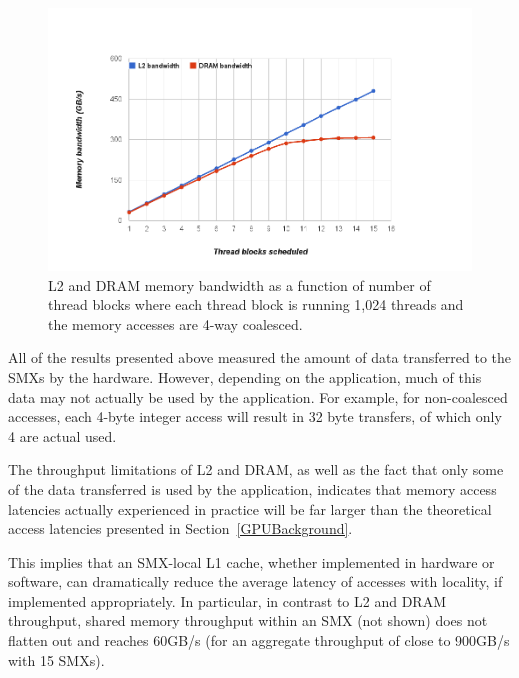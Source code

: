 \begin{figure}
\center
\includegraphics[scale=0.30]{DRAML2Bandwidth-4wayCoalesced.png}
\caption{\footnotesize\textnormal{L2 and DRAM memory bandwidth as a function of number of thread blocks where each thread
block is running 1,024 threads and the memory accesses are 4-way coalesced.
}}
\label{fig:L2-DRAM-bandwidth}
\end{figure}

All of the results presented above measured the amount of data transferred to the SMXs by the
hardware.
However, depending on the application, much of this data may not actually be used by the
application.
For example, for non-coalesced accesses, each 4-byte integer access will result in 32
byte transfers, of which only 4 are actual used.

The throughput limitations of L2 and DRAM, as well as the fact that only some of the data transferred is used by the application, indicates that memory access latencies actually experienced in practice will be far larger than the theoretical access latencies presented in Section~\ref{GPUBackground}.

This implies that an SMX-local L1 cache, whether implemented in hardware or software, can
dramatically reduce the average latency of accesses with locality, if implemented appropriately.
In particular, in contrast to L2 and DRAM throughput,  shared memory throughput within an SMX (not shown) does not flatten out and reaches 60GB/s (for an aggregate throughput of close to 900GB/s with 15 SMXs).









